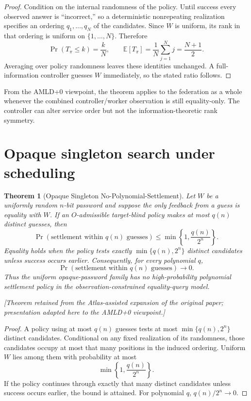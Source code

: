 \documentclass[11pt]{article}
\newtheorem{theorem}[definition]{Theorem}
\newcommand{\atlasnote}{\par\smallskip\noindent\textit{[Theorem retained from the Atlas-assisted expansion of the original paper; presentation adapted here to the AMLD+0 viewpoint.] }\par\smallskip}
\begin{document}
\begin{proof}
Condition on the internal randomness of the policy.  Until success every
observed answer is ``incorrect,'' so a deterministic nonrepeating realization
specifies an ordering $q_1,\ldots,q_N$ of the candidates.  Since $W$ is uniform,
its rank in that ordering is uniform on $\{1,\ldots,N\}$.  Therefore
\[
\Pr(T_\pi\le k)=\frac{k}{N},
\qquad
\mathbb E[T_\pi]=\frac1N\sum_{j=1}^N j=\frac{N+1}{2}.
\]
Averaging over policy randomness leaves these identities unchanged.  A
full-information controller guesses $W$ immediately, so the stated ratio
follows.
\end{proof}

From the AMLD+0 viewpoint, the theorem applies to the federation as a whole
whenever the combined controller/worker observation is still equality-only.
The controller can alter service order but not the information-theoretic rank
symmetry.

\section{Opaque singleton search under scheduling}

\begin{theorem}[Opaque Singleton No-Polynomial-Settlement]
Let $W$ be a uniformly random $n$-bit password and suppose the only feedback
from a guess is equality with $W$.  If an $O$-admissible target-blind policy makes at
most $q(n)$ distinct guesses, then
\[
\Pr(\text{settlement within }q(n)\text{ guesses})
\le
\min\left\{1,\frac{q(n)}{2^n}\right\}.
\]
Equality holds when the policy tests exactly
$\min\{q(n),2^n\}$ distinct candidates unless success occurs earlier.
Consequently, for every polynomial $q$,
\[
\Pr(\text{settlement within }q(n)\text{ guesses})\to 0.
\]
Thus the uniform opaque-password family has no high-probability polynomial
settlement policy in the observation-constrained equality-query model.
\end{theorem}
\atlasnote

\begin{proof}
A policy using at most $q(n)$ guesses tests at most
$\min\{q(n),2^n\}$ distinct candidates.  Conditional on any fixed realization
of its randomness, those candidates occupy at most that many positions in the
induced ordering.  Uniform $W$ lies among them with probability at most
\[
\min\left\{1,\frac{q(n)}{2^n}\right\}.
\]
If the policy continues through exactly that many distinct candidates unless
success occurs earlier, the bound is attained.  For polynomial $q$,
$q(n)/2^n\to 0$.
\end{proof}
\end{document}
